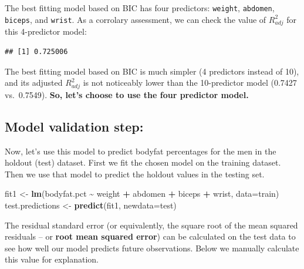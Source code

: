 \documentclass[
]{book}
\newenvironment{Shaded}{\begin{snugshade}}{\end{snugshade}}
\newcommand{\AttributeTok}[1]{\textcolor[rgb]{0.13,0.29,0.53}{#1}}
\newcommand{\FunctionTok}[1]{\textcolor[rgb]{0.13,0.29,0.53}{\textbf{#1}}}
\newcommand{\NormalTok}[1]{#1}
\newcommand{\OtherTok}[1]{\textcolor[rgb]{0.56,0.35,0.01}{#1}}
\newcommand{\SpecialCharTok}[1]{\textcolor[rgb]{0.81,0.36,0.00}{\textbf{#1}}}
\begin{document}
The best fitting model based on BIC has four predictors: \texttt{weight}, \texttt{abdomen}, \texttt{biceps}, and \texttt{wrist}. As a corrolary assessment, we can check the value of \(R^2_{adj}\) for this 4-predictor model:

\begin{Shaded}
\end{Shaded}

\begin{verbatim}
## [1] 0.725006
\end{verbatim}

The best fitting model based on BIC is much simpler (4 predictors instead of 10), and its adjusted \(R^2_{adj}\) is not noticeably lower than the 10-predictor model (0.7427 vs.~0.7549). \textbf{So, let's choose to use the four predictor model.}

\hypertarget{model-validation-step}{%
\subsection{Model validation step:}\label{model-validation-step}}

Now, let's use this model to predict bodyfat percentages for the men in the holdout (test) dataset. First we fit the chosen model on the training dataset. Then we use that model to predict the holdout values in the testing set.

\begin{Shaded}
\begin{Highlighting}[]
\NormalTok{fit1 }\OtherTok{\textless{}{-}} \FunctionTok{lm}\NormalTok{(bodyfat.pct }\SpecialCharTok{\textasciitilde{}}\NormalTok{ weight }\SpecialCharTok{+}\NormalTok{ abdomen }\SpecialCharTok{+}\NormalTok{ biceps }\SpecialCharTok{+}\NormalTok{ wrist, }\AttributeTok{data=}\NormalTok{train)}
\NormalTok{test.predictions }\OtherTok{\textless{}{-}} \FunctionTok{predict}\NormalTok{(fit1, }\AttributeTok{newdata=}\NormalTok{test)}
\end{Highlighting}
\end{Shaded}

The residual standard error (or equivalently, the square root of the mean squared residuals -- or \textbf{root mean squared error}) can be calculated on the test data to see how well our model predicts future observations. Below we manually calculate this value for explanation.
\end{document}
